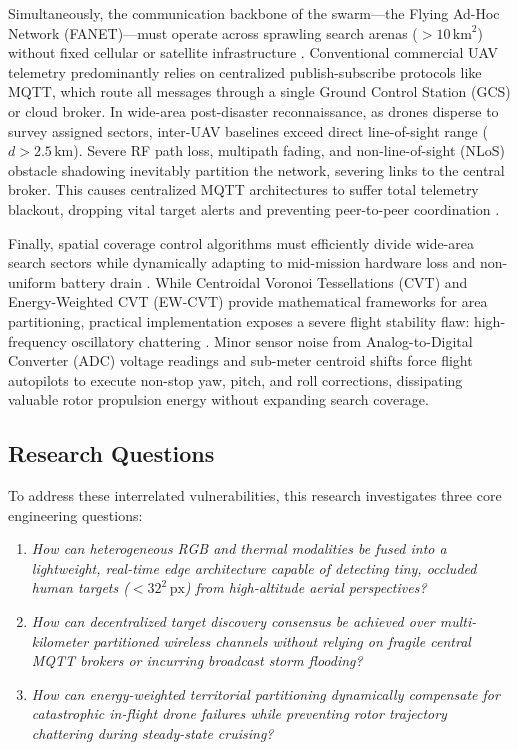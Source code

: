 \documentclass[conference]{IEEEtran}
\begin{document}
Simultaneously, the communication backbone of the swarm—the Flying Ad-Hoc Network (FANET)—must operate across sprawling search arenas ($>10\,\text{km}^2$) without fixed cellular or satellite infrastructure \cite{ref11, ref12}. Conventional commercial UAV telemetry predominantly relies on centralized publish-subscribe protocols like MQTT, which route all messages through a single Ground Control Station (GCS) or cloud broker. In wide-area post-disaster reconnaissance, as drones disperse to survey assigned sectors, inter-UAV baselines exceed direct line-of-sight range ($d > 2.5\,\text{km}$). Severe RF path loss, multipath fading, and non-line-of-sight (NLoS) obstacle shadowing inevitably partition the network, severing links to the central broker. This causes centralized MQTT architectures to suffer total telemetry blackout, dropping vital target alerts and preventing peer-to-peer coordination \cite{ref14, ref15, ref21}.

Finally, spatial coverage control algorithms must efficiently divide wide-area search sectors while dynamically adapting to mid-mission hardware loss and non-uniform battery drain \cite{ref9}. While Centroidal Voronoi Tessellations (CVT) and Energy-Weighted CVT (EW-CVT) provide mathematical frameworks for area partitioning, practical implementation exposes a severe flight stability flaw: high-frequency oscillatory chattering \cite{ref8}. Minor sensor noise from Analog-to-Digital Converter (ADC) voltage readings and sub-meter centroid shifts force flight autopilots to execute non-stop yaw, pitch, and roll corrections, dissipating valuable rotor propulsion energy without expanding search coverage.

\subsection{Research Questions}
To address these interrelated vulnerabilities, this research investigates three core engineering questions:
\begin{enumerate}
    \item \textit{How can heterogeneous RGB and thermal modalities be fused into a lightweight, real-time edge architecture capable of detecting tiny, occluded human targets ($<32^2\,\text{px}$) from high-altitude aerial perspectives?}
    \item \textit{How can decentralized target discovery consensus be achieved over multi-kilometer partitioned wireless channels without relying on fragile central MQTT brokers or incurring broadcast storm flooding?}
    \item \textit{How can energy-weighted territorial partitioning dynamically compensate for catastrophic in-flight drone failures while preventing rotor trajectory chattering during steady-state cruising?}
\end{enumerate}
\end{document}
